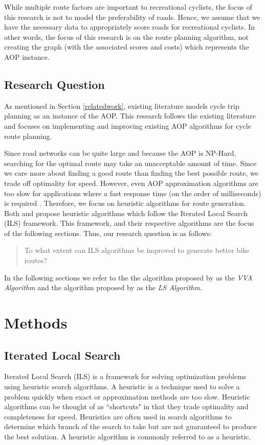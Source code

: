 \documentclass[11pt]{article}
\begin{document}
While multiple route factors are important to recreational cyclists, the focus of this research is not to model the preferability of roads. Hence, we assume that we have the necessary data to appropriately score roads for recreational cyclists. In other words, the focus of this research is on the route planning algorithm, not creating the graph (with the associated scores and costs) which represents the AOP instance.


\subsection{Research Question}
As mentioned in Section \ref{relatedwork}, existing literature models cycle trip planning as an instance of the AOP. This research follows the existing literature and focuses on implementing and improving existing AOP algorithms for cycle route planning. 

Since road networks can be quite large and because the AOP is NP-Hard, searching for the optimal route may take an unacceptable amount of time. Since we care more about finding a good route than finding the best possible route, we trade off optimality for speed. However, even AOP approximation algorithms are too slow for applications where a fast response time (on the order of milliseconds) is required \cite{lu2015arc}. Therefore, we focus on heuristic algorithms for route generation. Both \citeauthor{verbeeck2014extension} and \citeauthor{lu2015arc} propose heuristic algorithms which follow the Iterated Local Search (ILS) framework. This framework, and their respective algorithms are the focus of the following sections. Thus, our research question is as follows:

\begin{quote}
    To what extent can ILS algorithms be improved to generate better bike routes?
\end{quote}

In the following sections we refer to the the algorithm proposed by \citeauthor{verbeeck2014extension} as the \emph{VVA Algorithm} and the algorithm proposed by \citeauthor{lu2015arc} as the \emph{LS Algorithm}.


\section{Methods}

\subsection{Iterated Local Search}
Iterated Local Search (ILS) is a framework for solving optimization problems using heuristic search algorithms. A heuristic is a technique used to solve a problem quickly when exact or approximation methods are too slow. Heuristic algorithms can be thought of as ``shortcuts" in that they trade optimality and completeness for speed. Heuristics are often used in search algorithms to  determine which branch of the search to take but are not guaranteed to produce the best solution. A heuristic algorithm is commonly referred to as a heuristic.
\end{document}
